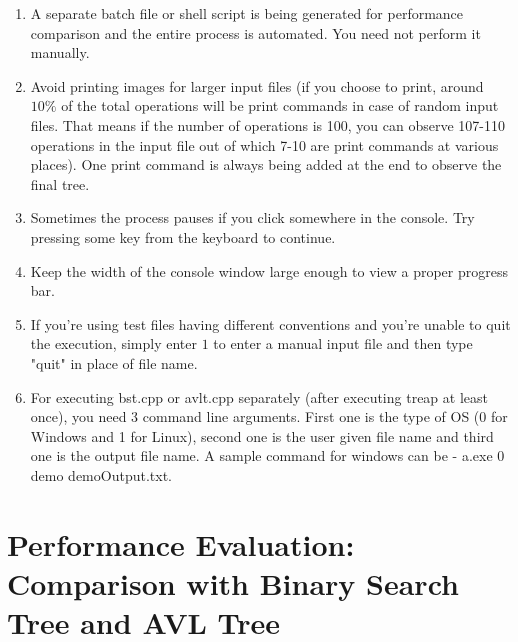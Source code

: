\documentclass{article}
\begin{document}
\begin{enumerate}
	\item A separate batch file or shell script is being generated for performance comparison and the entire process is automated. You need not perform it manually.
	\item Avoid printing images for larger input files (if you choose to print, around $10\%$ of the total operations will be print commands in case of random input files. That means if the number of operations is 100, you can observe 107-110 operations in the input file out of which 7-10 are print commands at various places). One print command is always being added at the end to observe the final tree.
	\item Sometimes the process pauses if you click somewhere in the console. Try pressing some key from the keyboard to continue.
	\item Keep the width of the console window large enough to view a proper progress bar.
	\item If you're using test files having different conventions and you're unable to quit the execution, simply enter $1$ to enter a manual input file and then type "quit" in place of file name.
	\item For executing bst.cpp or avlt.cpp separately (after executing treap at least once), you need 3 command line arguments. First one is the type of OS (0 for Windows and 1 for Linux), second one is the user given file name and third one is the output file name. A sample command for windows can be - a.exe 0 demo demoOutput.txt.
\end{enumerate}



\section{Performance Evaluation: Comparison with Binary Search Tree and AVL Tree}
\end{document}
